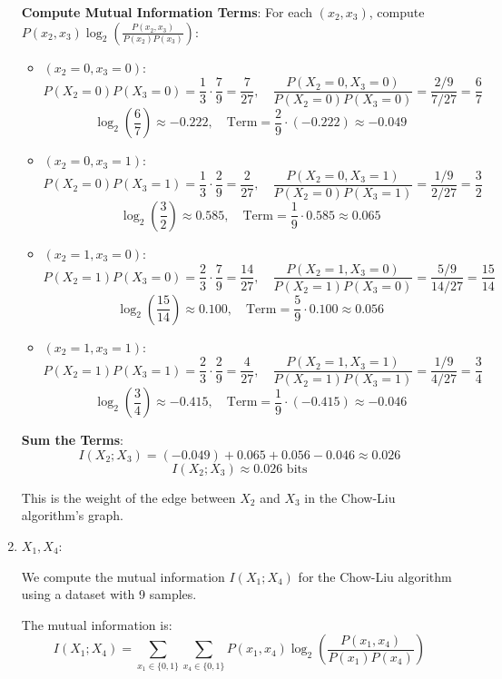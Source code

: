 \documentclass[a3paper,12pt]{extarticle} %
\begin{document}
\begin{enumerate}
\textbf{Compute Mutual Information Terms}:
For each \((x_2, x_3)\), compute \(P(x_2, x_3) \log_2 \left( \frac{P(x_2, x_3)}{P(x_2)P(x_3)} \right)\):
\begin{itemize}
    \item \((x_2 = 0, x_3 = 0)\):
    \[
    P(X_2 = 0)P(X_3 = 0) = \frac{1}{3} \cdot \frac{7}{9} = \frac{7}{27}, \quad \frac{P(X_2 = 0, X_3 = 0)}{P(X_2 = 0)P(X_3 = 0)} = \frac{2/9}{7/27} = \frac{6}{7}
    \]
    \[
    \log_2 \left( \frac{6}{7} \right) \approx -0.222, \quad \text{Term} = \frac{2}{9} \cdot (-0.222) \approx -0.049
    \]
    \item \((x_2 = 0, x_3 = 1)\):
    \[
    P(X_2 = 0)P(X_3 = 1) = \frac{1}{3} \cdot \frac{2}{9} = \frac{2}{27}, \quad \frac{P(X_2 = 0, X_3 = 1)}{P(X_2 = 0)P(X_3 = 1)} = \frac{1/9}{2/27} = \frac{3}{2}
    \]
    \[
    \log_2 \left( \frac{3}{2} \right) \approx 0.585, \quad \text{Term} = \frac{1}{9} \cdot 0.585 \approx 0.065
    \]
    \item \((x_2 = 1, x_3 = 0)\):
    \[
    P(X_2 = 1)P(X_3 = 0) = \frac{2}{3} \cdot \frac{7}{9} = \frac{14}{27}, \quad \frac{P(X_2 = 1, X_3 = 0)}{P(X_2 = 1)P(X_3 = 0)} = \frac{5/9}{14/27} = \frac{15}{14}
    \]
    \[
    \log_2 \left( \frac{15}{14} \right) \approx 0.100, \quad \text{Term} = \frac{5}{9} \cdot 0.100 \approx 0.056
    \]
    \item \((x_2 = 1, x_3 = 1)\):
    \[
    P(X_2 = 1)P(X_3 = 1) = \frac{2}{3} \cdot \frac{2}{9} = \frac{4}{27}, \quad \frac{P(X_2 = 1, X_3 = 1)}{P(X_2 = 1)P(X_3 = 1)} = \frac{1/9}{4/27} = \frac{3}{4}
    \]
    \[
    \log_2 \left( \frac{3}{4} \right) \approx -0.415, \quad \text{Term} = \frac{1}{9} \cdot (-0.415) \approx -0.046
    \]
\end{itemize}

\textbf{Sum the Terms}:
\[
I(X_2; X_3) = (-0.049) + 0.065 + 0.056 - 0.046 \approx 0.026
\]
\[
I(X_2; X_3) \approx 0.026 \text{ bits}
\]

This is the weight of the edge between \(X_2\) and \(X_3\) in the Chow-Liu algorithm's graph.
\item \(X_1, X_4\):

We compute the mutual information \(I(X_1; X_4)\) for the Chow-Liu algorithm using a dataset with 9 samples.

The mutual information is:
\[
I(X_1; X_4) = \sum_{x_1 \in \{0,1\}} \sum_{x_4 \in \{0,1\}} P(x_1, x_4) \log_2 \left( \frac{P(x_1, x_4)}{P(x_1)P(x_4)} \right)
\]


\end{enumerate}
\end{document}
